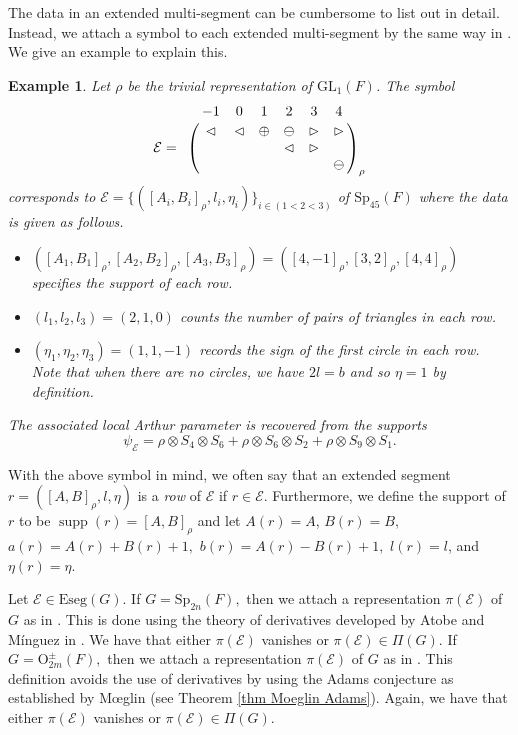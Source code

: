 \documentclass[11pt,letterpaper]{amsart}
\newcommand{\Eseg}{{\mathrm{Eseg}}}
\newcommand{\GL}{\mathrm{GL}}
\newcommand{\OO}{\mathrm{O}}
\newcommand{\Sp}{\mathrm{Sp}}
\newcommand{\EE}{\mathcal{E}}
\newtheorem{exmp}[thm]{Example}
\DeclareMathOperator{\supp}{supp}
\numberwithin{equation}{section}
\begin{document}
The data in an extended multi-segment can be cumbersome to list out in detail. Instead, 
we attach a symbol to each extended multi-segment by the same way in \cite[Section 3]{Ato20b}. We give an example to explain this.
\begin{exmp}\label{exmp symbol}
 Let $\rho$ be the trivial representation of $\GL_1(F)$. The symbol
\[\EE=\bordermatrix{
& -1 & 0 &1 & 2 &3 & 4\cr
& \lhd & \lhd & \oplus & \ominus & \rhd & \rhd \cr
&  &  &  & \lhd &\rhd  &  \cr
&  &  &  &  &  & \ominus \cr
}_{\rho}\]
corresponds to $\EE= \{ ([A_i,B_i]_{\rho},l_i,\eta_i)\}_{i \in (1<2<3)}$ of $\Sp_{45}(F)$ where the data is given as follows.
\begin{itemize}
    \item  $([A_1,B_1]_{\rho},[A_2,B_2]_{\rho},[A_3,B_3]_{\rho})=([4,-1]_{\rho},[3,2]_{\rho},[4,4]_{\rho})$ specifies the support of each row.
    \item  $(l_1,l_2,l_3)=(2,1,0)$ counts the number of pairs of triangles in each row. 
    \item  $(\eta_1,\eta_2,\eta_3)=(1, 1, -1)$ records the sign of the first circle in each row. Note that when there are no circles, we have $2l=b$ and so $\eta=1$ by definition.
\end{itemize}
The associated local Arthur parameter is recovered from the supports
    \[ \psi_{\EE}= \rho \otimes S_{4}\otimes S_{6} + \rho \otimes S_{6}\otimes S_{2} + \rho \otimes S_9 \otimes S_1.  \]
\end{exmp}

With the above symbol in mind, we often say that an extended segment $r=([A,B]_\rho,l,\eta)$ is a \emph{row} of $\EE$ if $r\in \EE.$ Furthermore, we define the support of $r$ to be $\supp(r)=[A,B]_\rho$ and let $A(r)=A$, $B(r)=B,$ $a(r)=A(r)+B(r)+1,$ $b(r)=A(r)-B(r)+1,$ $l(r)=l$, and $\eta(r)=\eta.$

Let $\EE\in\Eseg(G).$ If $G=\Sp_{2n}(F),$ then we attach a representation $\pi(\EE)$ of $G$ as in \cite[\S3.2]{Ato20b}. This is done using the theory of derivatives developed by Atobe and M{\'i}nguez in \cite{AM23}. We have that either $\pi(\EE)$ vanishes or $\pi(\EE)\in\Pi(G).$ If $G=\OO_{2m}^\pm(F),$ then we attach a representation $\pi(\EE)$ of $G$ as in \cite[Definition 6.3]{HLL25}. This definition avoids the use of derivatives by using the Adams conjecture as established by M{\oe}glin (see Theorem \ref{thm Moeglin Adams}).
Again, we have that either $\pi(\EE)$ vanishes or $\pi(\EE)\in\Pi(G).$
\end{document}
